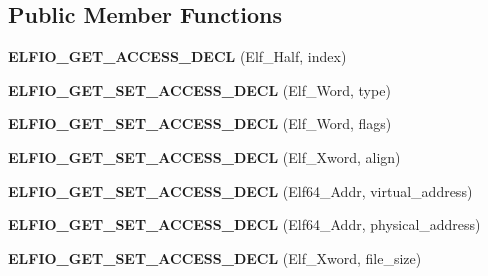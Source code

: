 \subsection*{Public Member Functions}
\begin{DoxyCompactItemize}
\item 
{\bfseries E\+L\+F\+I\+O\+\_\+\+G\+E\+T\+\_\+\+A\+C\+C\+E\+S\+S\+\_\+\+D\+E\+CL} (Elf\+\_\+\+Half, index)\hypertarget{class_e_l_f_i_o_1_1segment_a8fd5eedce5fa6deb8c6d96d20d2d42cc}{}\label{class_e_l_f_i_o_1_1segment_a8fd5eedce5fa6deb8c6d96d20d2d42cc}

\item 
{\bfseries E\+L\+F\+I\+O\+\_\+\+G\+E\+T\+\_\+\+S\+E\+T\+\_\+\+A\+C\+C\+E\+S\+S\+\_\+\+D\+E\+CL} (Elf\+\_\+\+Word, type)\hypertarget{class_e_l_f_i_o_1_1segment_af25f32e51b53b2535457e340447522c1}{}\label{class_e_l_f_i_o_1_1segment_af25f32e51b53b2535457e340447522c1}

\item 
{\bfseries E\+L\+F\+I\+O\+\_\+\+G\+E\+T\+\_\+\+S\+E\+T\+\_\+\+A\+C\+C\+E\+S\+S\+\_\+\+D\+E\+CL} (Elf\+\_\+\+Word, flags)\hypertarget{class_e_l_f_i_o_1_1segment_a58499777fc26d903fa5ff1f4952aca07}{}\label{class_e_l_f_i_o_1_1segment_a58499777fc26d903fa5ff1f4952aca07}

\item 
{\bfseries E\+L\+F\+I\+O\+\_\+\+G\+E\+T\+\_\+\+S\+E\+T\+\_\+\+A\+C\+C\+E\+S\+S\+\_\+\+D\+E\+CL} (Elf\+\_\+\+Xword, align)\hypertarget{class_e_l_f_i_o_1_1segment_aea696e3907fdeeb6b3418225402689ca}{}\label{class_e_l_f_i_o_1_1segment_aea696e3907fdeeb6b3418225402689ca}

\item 
{\bfseries E\+L\+F\+I\+O\+\_\+\+G\+E\+T\+\_\+\+S\+E\+T\+\_\+\+A\+C\+C\+E\+S\+S\+\_\+\+D\+E\+CL} (Elf64\+\_\+\+Addr, virtual\+\_\+address)\hypertarget{class_e_l_f_i_o_1_1segment_a7400fbddca2b284c832247284db29f38}{}\label{class_e_l_f_i_o_1_1segment_a7400fbddca2b284c832247284db29f38}

\item 
{\bfseries E\+L\+F\+I\+O\+\_\+\+G\+E\+T\+\_\+\+S\+E\+T\+\_\+\+A\+C\+C\+E\+S\+S\+\_\+\+D\+E\+CL} (Elf64\+\_\+\+Addr, physical\+\_\+address)\hypertarget{class_e_l_f_i_o_1_1segment_a627bcb8680fbe791b1d8f9f9d57a7223}{}\label{class_e_l_f_i_o_1_1segment_a627bcb8680fbe791b1d8f9f9d57a7223}

\item 
{\bfseries E\+L\+F\+I\+O\+\_\+\+G\+E\+T\+\_\+\+S\+E\+T\+\_\+\+A\+C\+C\+E\+S\+S\+\_\+\+D\+E\+CL} (Elf\+\_\+\+Xword, file\+\_\+size)\hypertarget{class_e_l_f_i_o_1_1segment_a110df662a2995ea799dc092ebadbeb04}{}\label{class_e_l_f_i_o_1_1segment_a110df662a2995ea799dc092ebadbeb04}


\end{DoxyCompactItemize}
